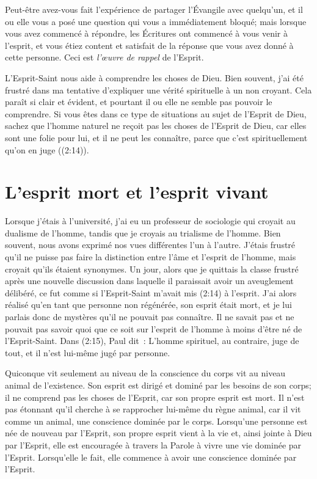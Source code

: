 Peut-être avez-vous fait l'expérience de partager l'Évangile avec quelqu'un,
 et il ou elle vous a posé une question qui vous a immédiatement bloqué;
 mais lorsque vous avez commencé à répondre, les Écritures ont commencé
 à vous venir à l'esprit, et vous étiez content et satisfait de la réponse
 que vous avez donné à cette personne. Ceci est \emph{l'œuvre de rappel}
 de l'Esprit.

L'Esprit-Saint nous aide à comprendre les choses de Dieu.
 Bien souvent, j'ai été frustré dans ma tentative d'expliquer
 une vérité spirituelle à un non croyant.
 Cela paraît si clair et évident, et pourtant il ou elle ne semble pas
 pouvoir le comprendre.
 Si vous êtes dans ce type de situations au sujet de l'Esprit de Dieu,
 sachez que l'homme naturel \og ne reçoit pas les choses de l'Esprit de Dieu,
 car elles sont une folie pour lui, et il ne peut les connaître, 
 parce que c'est spirituellement qu'on en juge \fg{}
 ((2:14)).


\section{L'esprit mort et l'esprit vivant}

\begin{specialpar}{}
Lorsque j'étais à l'université, j'ai eu un professeur de sociologie
 qui croyait au dualisme de l'homme, tandis que je croyais au trialisme de l'homme.
 Bien souvent, nous avons exprimé nos vues différentes l'un à l'autre.
 J'étais frustré qu'il ne puisse pas faire la distinction entre l'âme
 et l'esprit de l'homme, mais croyait qu'ils étaient synonymes.
 Un jour, alors que je quittais la classe frustré
 après une nouvelle discussion dans laquelle il paraissait
 avoir un aveuglement délibéré, ce fut comme si l'Esprit-Saint
 m'avait mis (2:14) à l'esprit.
 J'ai alors réalisé qu'en tant que \linebreak
 personne non régénérée, son esprit était mort,
 et je lui parlais donc de mystères qu'il ne
 pouvait pas connaître.
 Il ne savait pas et ne
 pouvait pas savoir quoi que ce soit sur l'esprit
 de l'homme à moins d'être né de l'Esprit-Saint.
 Dans (2:15), Paul dit~:
 \og L'homme spirituel, au contraire, juge de tout,
 et il n'est lui-même jugé par personne. \fg{}
\end{specialpar}

Quiconque vit seulement au niveau de la conscience du corps
 vit au niveau animal de l'existence.
 Son esprit est dirigé et dominé par les besoins de son corps;
 il ne comprend pas les choses de l'Esprit, car son propre esprit est mort.
 Il n'est pas étonnant qu'il cherche à se rapprocher lui-même
 du règne animal, car il vit comme un animal,
 une conscience dominée par le corps.
 Lorsqu'une personne est née de nouveau par l'Esprit,
 son propre esprit vient à la vie et, ainsi jointe à Dieu par l'Esprit,
 elle est encouragée à travers la Parole à vivre une vie dominée par l'Esprit.
 Lorsqu'elle le fait, elle commence à avoir une conscience dominée par l'Esprit.


